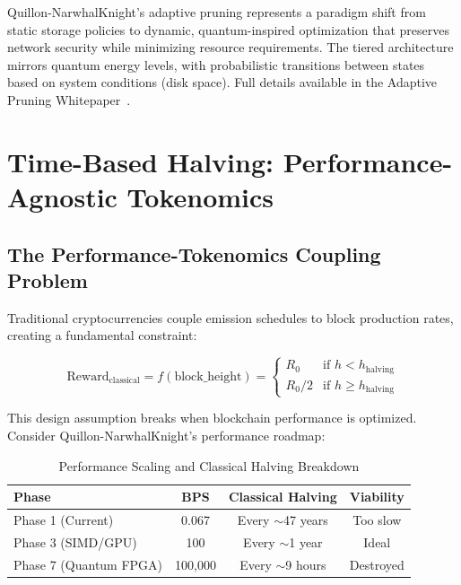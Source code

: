 \documentclass[11pt,a4paper]{article}
\begin{document}
Quillon-NarwhalKnight's adaptive pruning represents a paradigm shift from static storage policies to dynamic, quantum-inspired optimization that preserves network security while minimizing resource requirements. The tiered architecture mirrors quantum energy levels, with probabilistic transitions between states based on system conditions (disk space). Full details available in the Adaptive Pruning Whitepaper~\cite{adaptivepruning2025}.

\section{Time-Based Halving: Performance-Agnostic Tokenomics}

\subsection{The Performance-Tokenomics Coupling Problem}

Traditional cryptocurrencies couple emission schedules to block production rates, creating a fundamental constraint:

\begin{equation}
\text{Reward}_{\text{classical}} = f(\text{block\_height}) = \begin{cases}
R_0 & \text{if } h < h_{\text{halving}} \\
R_0 / 2 & \text{if } h \geq h_{\text{halving}}
\end{cases}
\end{equation}

This design assumption breaks when blockchain performance is optimized. Consider Quillon-NarwhalKnight's performance roadmap:

\begin{table}[H]
\centering
\caption{Performance Scaling and Classical Halving Breakdown}
\begin{tabular}{|l|c|c|c|}
\hline
\textbf{Phase} & \textbf{BPS} & \textbf{Classical Halving} & \textbf{Viability} \\
\hline
Phase 1 (Current) & 0.067 & Every $\sim$47 years & Too slow \\
Phase 3 (SIMD/GPU) & 100 & Every $\sim$1 year & Ideal \\
Phase 7 (Quantum FPGA) & 100,000 & Every $\sim$9 hours & Destroyed \\
\hline
\end{tabular}
\label{tab:halving-breakdown}
\end{table}
\end{document}
